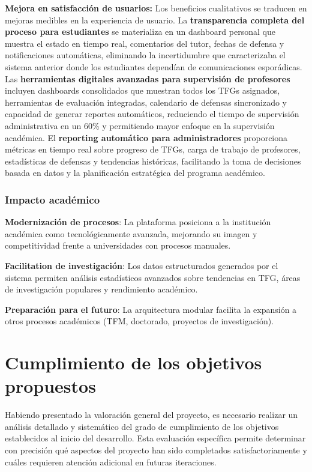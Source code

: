 \documentclass[12pt,a4paper,oneside]{report}
\begin{document}
\textbf{Mejora en satisfacción de usuarios:} Los beneficios cualitativos se traducen en mejoras medibles en la experiencia de usuario. La \textbf{transparencia completa del proceso para estudiantes} se materializa en un dashboard personal que muestra el estado en tiempo real, comentarios del tutor, fechas de defensa y notificaciones automáticas, eliminando la incertidumbre que caracterizaba el sistema anterior donde los estudiantes dependían de comunicaciones esporádicas. Las \textbf{herramientas digitales avanzadas para supervisión de profesores} incluyen dashboards consolidados que muestran todos los TFGs asignados, herramientas de evaluación integradas, calendario de defensas sincronizado y capacidad de generar reportes automáticos, reduciendo el tiempo de supervisión administrativa en un 60\% y permitiendo mayor enfoque en la supervisión académica. El \textbf{reporting automático para administradores} proporciona métricas en tiempo real sobre progreso de TFGs, carga de trabajo de profesores, estadísticas de defensas y tendencias históricas, facilitando la toma de decisiones basada en datos y la planificación estratégica del programa académico.

\subsubsection{Impacto académico}\label{impacto-acaduxe9mico}

\textbf{Modernización de procesos}: La plataforma posiciona a la
institución académica como tecnológicamente avanzada, mejorando su
imagen y competitividad frente a universidades con procesos manuales.

\textbf{Facilitation de investigación}: Los datos estructurados
generados por el sistema permiten análisis estadísticos avanzados sobre
tendencias en TFG, áreas de investigación populares y rendimiento
académico.

\textbf{Preparación para el futuro}: La arquitectura modular facilita la
expansión a otros procesos académicos (TFM, doctorado, proyectos de
investigación).

\section{Cumplimiento de los objetivos
propuestos}\label{cumplimiento-de-los-objetivos-propuestos}

Habiendo presentado la valoración general del proyecto, es necesario
realizar un análisis detallado y sistemático del grado de cumplimiento
de los objetivos establecidos al inicio del desarrollo. Esta evaluación
específica permite determinar con precisión qué aspectos del proyecto
han sido completados satisfactoriamente y cuáles requieren atención
adicional en futuras iteraciones.
\end{document}
